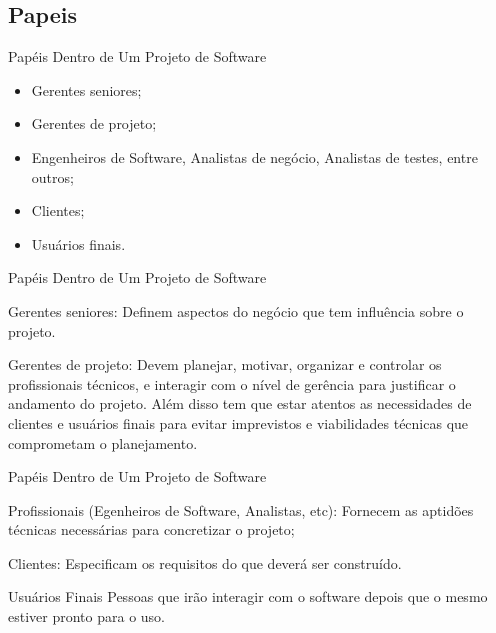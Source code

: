 \documentclass[xcolor=x11names,compress]{beamer}
\begin{document}
\subsection{Papeis}

\begin{frame}{Papéis Dentro de Um Projeto de Software}

\begin{itemize}
\itemsep 5mm

\item Gerentes seniores;

\item Gerentes de projeto;

\item Engenheiros de Software, Analistas de negócio, Analistas de testes, entre outros;

\item Clientes;

\item Usuários finais.

\end{itemize}

\end{frame}

\begin{frame}{Papéis Dentro de Um Projeto de Software}

\begin{alertblock}{Gerentes seniores:}
Definem aspectos do negócio que tem influência sobre o projeto.
\end{alertblock}

\pause

\begin{alertblock}{Gerentes de projeto:}
Devem planejar, motivar, organizar e controlar os profissionais técnicos, e interagir com o nível de gerência para justificar o andamento do projeto. Além disso tem que estar atentos as necessidades de clientes e usuários finais para evitar imprevistos e viabilidades técnicas que comprometam o planejamento.
\end{alertblock}

\end{frame}

\begin{frame}{Papéis Dentro de Um Projeto de Software}

\begin{alertblock}{Profissionais (Egenheiros de Software, Analistas, etc):}
Fornecem as aptidões técnicas necessárias para concretizar o projeto;
\end{alertblock}

\begin{alertblock}{Clientes:}
Especificam os requisitos do que deverá ser construído.
\end{alertblock}

\begin{alertblock}{Usuários Finais}
Pessoas que irão interagir com o software depois que o mesmo estiver pronto para o uso.
\end{alertblock}
\end{frame}
\end{document}
